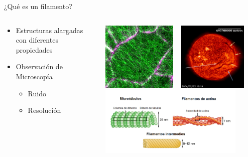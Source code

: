 \documentclass[aspectratio=169]{beamer}
\newenvironment{figure*}%
{\begin{figure}}
{\end{figure}}
\begin{document}
\begin{frame}{¿Qu\'e es un filamento?}
    \begin{columns}
    \begin{column}{0.4\textwidth}
        \begin{itemize}
            \item Estructuras alargadas con diferentes propiedades
            \item Observaci\'on de Microscop\'ia
            \begin{itemize}
            \small
                \item Ruido
                \item Resoluci\'on
            \end{itemize}
        \end{itemize}
    \end{column}
    \begin{column}{0.6\textwidth}
        \centering
        \includegraphics[height=1.3in]{Pictures/small_MT.jpg}
        ~ 
        \includegraphics[height=1.3in]{Pictures/sun_filament.jpg}
        \vspace{0.2cm}
        \includegraphics[height=1.3in]{Pictures/citoesqueletoo-min.png}
    \end{column}
\end{columns}
\end{frame}
\end{document}
